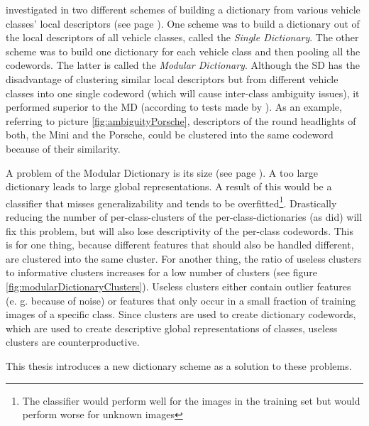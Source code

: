 \citeauthor{siddiqui2015robust} \citep{siddiqui2015robust} investigated in two different schemes of building a dictionary from various vehicle classes' local descriptors (see page \pageref{par:dictionaryGenerationStateOfTheArt}). One scheme was to build a dictionary out of the local descriptors of all vehicle classes, called the \emph{Single Dictionary}. The other scheme was to build one dictionary for each vehicle class and then pooling all the codewords. The latter is called the \emph{Modular Dictionary}. Although the SD has the disadvantage of clustering similar local descriptors but from different vehicle classes into one single codeword (which will cause inter-class ambiguity issues), it performed superior to the MD (according to tests made by \citeauthor{siddiqui2015robust}). As an example, referring to picture \ref{fig:ambiguityPorsche}, descriptors of the round headlights of both, the Mini and the Porsche, could be clustered into the same codeword because of their similarity.

A problem of the Modular Dictionary is its size (see page \pageref{par:dictionaryGenerationStateOfTheArt}). A too large dictionary leads to large global representations. A result of this would be a classifier that misses generalizability and tends to be overfitted\footnote{The classifier would perform well for the images in the training set but would perform worse for unknown images}. Drastically reducing the number of per-class-clusters of the per-class-dictionaries (as \citeauthor{siddiqui2015robust} did) will fix this problem, but will also lose descriptivity of the per-class codewords. This is for one thing, because different features that should also be handled different, are clustered into the same cluster. For another thing, the ratio of useless clusters to informative clusters increases for a low number of clusters (see figure \ref{fig:modularDictionaryClusters}). Useless clusters either contain outlier features (e. g. because of noise) or features that only occur in a small fraction of training images of a specific class. Since clusters are used to create dictionary codewords, which are used to create descriptive global representations of classes, useless clusters are counterproductive.

This thesis introduces a new dictionary scheme as a solution to these problems.

